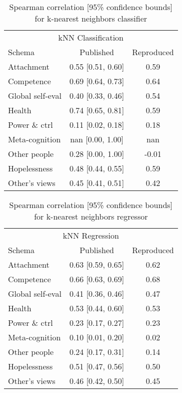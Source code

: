 \documentclass[11pt,a4paper]{article}
\begin{document}
\begin{table}[H]
\centering
\begin{tabular}{lcc}
\toprule
\multicolumn{3}{c}{\large kNN Classification} \\
Schema                  &Published          &Reproduced \\ %
\midrule
Attachment              & 0.55 [0.51, 0.60] & 0.59  \\
Competence              & 0.69 [0.64, 0.73] & 0.64  \\
Global self-eval        & 0.40 [0.33, 0.46] & 0.54  \\
Health                  & 0.74 [0.65, 0.81] & 0.59  \\
Power \& ctrl           & 0.11 [0.02, 0.18] & 0.18  \\
Meta-cognition          & nan [0.00, 1.00]  & nan   \\
Other people            & 0.28 [0.00, 1.00] & -0.01 \\
Hopelessness            & 0.48 [0.44, 0.55] & 0.59  \\
Other's views           & 0.45 [0.41, 0.51] & 0.42  \\
\bottomrule
\end{tabular}
\caption{Spearman correlation [95\% confidence bounds] for k-nearest neighbors classifier}
\label{tab:knn_classification}
\end{table}

\begin{table}[H]
\centering
\begin{tabular}{lcc}
\toprule
\multicolumn{3}{c}{\large kNN Regression} \\
Schema                  &Published          &Reproduced \\ %
\midrule
Attachment              & 0.63 [0.59, 0.65] & 0.62 \\
Competence              & 0.66 [0.63, 0.69] & 0.68 \\
Global self-eval        & 0.41 [0.36, 0.46] & 0.47 \\
Health                  & 0.53 [0.44, 0.60] & 0.53 \\
Power \& ctrl           & 0.23 [0.17, 0.27] & 0.23 \\
Meta-cognition          & 0.10 [0.01, 0.20] & 0.02 \\
Other people            & 0.24 [0.17, 0.31] & 0.14 \\
Hopelessness            & 0.51 [0.47, 0.56] & 0.50 \\
Other's views           & 0.46 [0.42, 0.50] & 0.45 \\
\bottomrule
\end{tabular}
\caption{Spearman correlation [95\% confidence bounds] for k-nearest neighbors regressor}
\label{tab:knn_regression}
\end{table}
\end{document}
